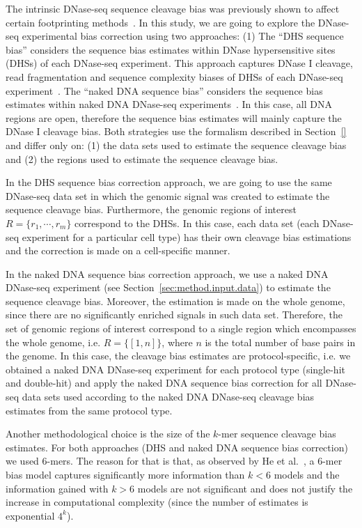 The intrinsic DNase-seq sequence cleavage bias was previously shown to affect certain footprinting methods~\cite{he2014}. In this study, we are going to explore the DNase-seq experimental bias correction using two approaches: (1) The ``DHS sequence bias'' considers the sequence bias estimates within DNase hypersensitive sites (DHSs) of each DNase-seq experiment. This approach captures DNase I cleavage, read fragmentation and sequence complexity biases of DHSs of each DNase-seq experiment~\cite{he2014}. The ``naked DNA sequence bias'' considers the sequence bias estimates within naked DNA DNase-seq experiments~\cite{yardimci2014}. In this case, all DNA regions are open, therefore the sequence bias estimates will mainly capture the DNase I cleavage bias. Both strategies use the formalism described in Section~\ref{} and differ only on: (1) the data sets used to estimate the sequence cleavage bias and (2) the regions used to estimate the sequence cleavage bias.

In the DHS sequence bias correction approach, we are going to use the same DNase-seq data set in which the genomic signal was created to estimate the sequence cleavage bias. Furthermore, the genomic regions of interest $R = \{{r}_{1}, \cdots, {r}_{m}\}$ correspond to the DHSs. In this case, each data set (each DNase-seq experiment for a particular cell type) has their own cleavage bias estimations and the correction is made on a cell-specific manner.

In the naked DNA sequence bias correction approach, we use a naked DNA DNase-seq experiment (see Section~\ref{sec:method.input.data}) to estimate the sequence cleavage bias. Moreover, the estimation is made on the whole genome, since there are no significantly enriched signals in such data set. Therefore, the set of genomic regions of interest correspond to a single region which encompasses the whole genome, i.e. $R = \{ [1,n] \}$, where $n$ is the total number of base pairs in the genome. In this case, the cleavage bias estimates are protocol-specific, i.e. we obtained a naked DNA DNase-seq experiment for each protocol type (single-hit and double-hit) and apply the naked DNA sequence bias correction for all DNase-seq data sets used according to the naked DNA DNase-seq cleavage bias estimates from the same protocol type.

Another methodological choice is the size of the $k$-mer sequence cleavage bias estimates. For both approaches (DHS and naked DNA sequence bias correction) we used $6$-mers. The reason for that is that, as observed by He et al.~\cite{he2014}, a $6$-mer bias model captures significantly more information than $k < 6$ models and the information gained with $k > 6$ models are not significant and does not justify the increase in computational complexity (since the number of estimates is exponential $4^k$).

